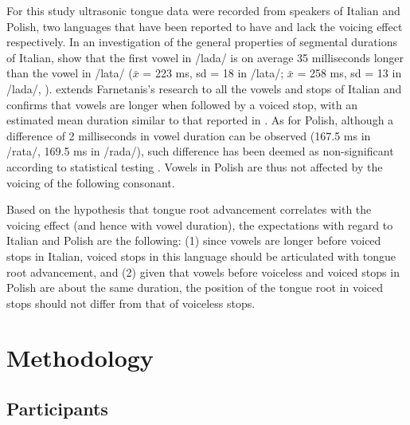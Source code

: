 \documentclass[authoryear, twocolumn]{elsarticle}
\begin{document}
For this study ultrasonic tongue data were recorded from speakers of
Italian and Polish, two languages that have been reported to have and
lack the voicing effect respectively. In an investigation of the general
properties of segmental durations of Italian, \citet{farnetani1986} show
that the first vowel in /lada/ is on average 35 milliseconds longer than
the vowel in /lata/ (\(\bar{x}\) = 223 ms, sd = 18 in /lata/;
\(\bar{x}\) = 258 ms, sd = 13 in /lada/, \citealt[26]{farnetani1986}).
\citet{esposito2002} extends Farnetanis's research to all the vowels and
stops of Italian and confirms that vowels are longer when followed by a
voiced stop, with an estimated mean duration similar to that reported in
\citet{farnetani1986}. As for Polish, although a difference of 2
milliseconds in vowel duration can be observed (167.5 ms in /rata/,
169.5 ms in /rada/), such difference has been deemed as non-significant
according to statistical testing \citep{keating1984}. Vowels in Polish
are thus not affected by the voicing of the following consonant.

Based on the hypothesis that tongue root advancement correlates with the
voicing effect (and hence with vowel duration), the expectations with
regard to Italian and Polish are the following: (1) since vowels are
longer before voiced stops in Italian, voiced stops in this language
should be articulated with tongue root advancement, and (2) given that
vowels before voiceless and voiced stops in Polish are about the same
duration, the position of the tongue root in voiced stops should not
differ from that of voiceless stops.

\section{Methodology}\label{methodology}

\subsection{Participants}\label{participants}

\end{document}
